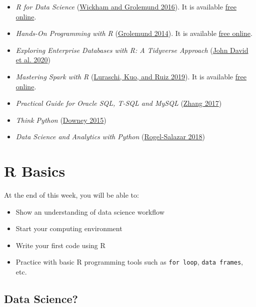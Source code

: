 \documentclass[
  letterpaper,
  DIV=11,
  numbers=noendperiod]{scrreprt}
\providecommand{\tightlist}{%
  \setlength{\itemsep}{0pt}\setlength{\parskip}{0pt}}\usepackage{longtable,booktabs,array}
\begin{document}
\begin{itemize}
\tightlist
\item
  \emph{R for Data Science}
  (\protect\hyperlink{ref-wickham2016r}{Wickham and Grolemund 2016}). It
  is available \href{https://r4ds.had.co.nz/}{free online}.
\item
  \emph{Hands-On Programming with R}
  (\protect\hyperlink{ref-grolemund2014hands}{Grolemund 2014}). It is
  available \href{https://rstudio-education.github.io/hopr/}{free
  online}.
\item
  \emph{Exploring Enterprise Databases with R: A Tidyverse Approach}
  (\protect\hyperlink{ref-databaser2020}{John David et al. 2020})
\item
  \emph{Mastering Spark with R}
  (\protect\hyperlink{ref-luraschi2019mastering}{Luraschi, Kuo, and Ruiz
  2019}). It is available \href{https://therinspark.com/index.html}{free
  online}.
\item
  \emph{Practical Guide for Oracle SQL, T-SQL and MySQL}
  (\protect\hyperlink{ref-zhang2017practical}{Zhang 2017})
\item
  \emph{Think Python} (\protect\hyperlink{ref-Allenpython}{Downey 2015})
\item
  \emph{Data Science and Analytics with Python}
  (\protect\hyperlink{ref-rogel2018data}{Rogel-Salazar 2018})
\end{itemize}

\hypertarget{r-basics}{%
\chapter*{R Basics}\label{r-basics}}


At the end of this week, you will be able to:

\begin{itemize}
\tightlist
\item
  Show an understanding of data science workflow
\item
  Start your computing environment
\item
  Write your first code using R
\item
  Practice with basic R programming tools such as \texttt{for\ loop},
  \texttt{data\ frames}, etc.
\end{itemize}

\hypertarget{data-science}{%
\section*{Data Science?}\label{data-science}}
\end{document}
